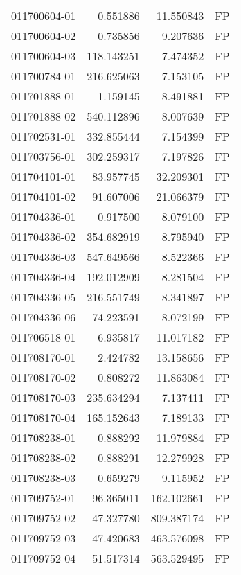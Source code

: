 \begin{tabular}{lrrl}
011700604-01 &    0.551886 &      11.550843 &   FP \\
011700604-02 &    0.735856 &       9.207636 &   FP \\
011700604-03 &  118.143251 &       7.474352 &   FP \\
011700784-01 &  216.625063 &       7.153105 &   FP \\
011701888-01 &    1.159145 &       8.491881 &   FP \\
011701888-02 &  540.112896 &       8.007639 &   FP \\
011702531-01 &  332.855444 &       7.154399 &   FP \\
011703756-01 &  302.259317 &       7.197826 &   FP \\
011704101-01 &   83.957745 &      32.209301 &   FP \\
011704101-02 &   91.607006 &      21.066379 &   FP \\
011704336-01 &    0.917500 &       8.079100 &   FP \\
011704336-02 &  354.682919 &       8.795940 &   FP \\
011704336-03 &  547.649566 &       8.522366 &   FP \\
011704336-04 &  192.012909 &       8.281504 &   FP \\
011704336-05 &  216.551749 &       8.341897 &   FP \\
011704336-06 &   74.223591 &       8.072199 &   FP \\
011706518-01 &    6.935817 &      11.017182 &   FP \\
011708170-01 &    2.424782 &      13.158656 &   FP \\
011708170-02 &    0.808272 &      11.863084 &   FP \\
011708170-03 &  235.634294 &       7.137411 &   FP \\
011708170-04 &  165.152643 &       7.189133 &   FP \\
011708238-01 &    0.888292 &      11.979884 &   FP \\
011708238-02 &    0.888291 &      12.279928 &   FP \\
011708238-03 &    0.659279 &       9.115952 &   FP \\
011709752-01 &   96.365011 &     162.102661 &   FP \\
011709752-02 &   47.327780 &     809.387174 &   FP \\
011709752-03 &   47.420683 &     463.576098 &   FP \\
011709752-04 &   51.517314 &     563.529495 &   FP \\

\end{tabular}
